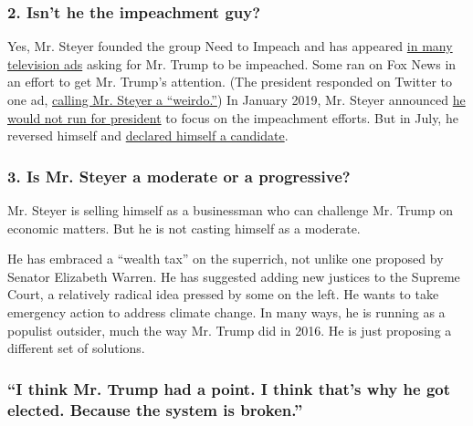 \hypertarget{2-isnt-he-the-impeachment-guy}{%
\subsubsection{\texorpdfstring{\textbf{2. Isn't he the impeachment
guy?}}{2. Isn't he the impeachment guy?}}\label{2-isnt-he-the-impeachment-guy}}

Yes, Mr. Steyer founded the group Need to Impeach and has appeared
\href{https://www.nytimes.com/2018/01/23/us/politics/impeach-trump-democrats-tom-steyer.html}{in
many television ads} asking for Mr. Trump to be impeached. Some ran on
Fox News in an effort to get Mr. Trump's attention. (The president
responded on Twitter to one ad,
\href{https://www.nytimes.com/interactive/2016/01/28/upshot/donald-trump-twitter-insults.html\#the-letter-S}{calling
Mr. Steyer a ``weirdo.''}) In January 2019, Mr. Steyer announced
\href{https://www.nytimes.com/2019/01/09/us/politics/tom-steyer-trump-2020.html}{he
would not run for president} to focus on the impeachment efforts. But in
July, he reversed himself and
\href{https://www.nytimes.com/2019/07/09/us/politics/tom-steyer-president.html}{declared
himself a candidate}.

\hypertarget{3-is-mr-steyer-a-moderate-or-a-progressive}{%
\subsubsection{\texorpdfstring{\textbf{3. Is Mr. Steyer a moderate or a
progressive?}}{3. Is Mr. Steyer a moderate or a progressive?}}\label{3-is-mr-steyer-a-moderate-or-a-progressive}}

Mr. Steyer is selling himself as a businessman who can challenge Mr.
Trump on economic matters. But he is not casting himself as a moderate.

He has embraced a ``wealth tax'' on the superrich, not unlike one
proposed by Senator Elizabeth Warren. He has suggested adding new
justices to the Supreme Court, a relatively radical idea pressed by some
on the left. He wants to take emergency action to address climate
change. In many ways, he is running as a populist outsider, much the way
Mr. Trump did in 2016. He is just proposing a different set of
solutions.

\hypertarget{i-think-mr-trump-had-a-point-i-think-thats-why-he-got-elected-because-the-system-is-broken}{%
\subsubsection{``I think Mr. Trump had a point. I think that's why he
got elected. Because the system is
broken.''}\label{i-think-mr-trump-had-a-point-i-think-thats-why-he-got-elected-because-the-system-is-broken}}

